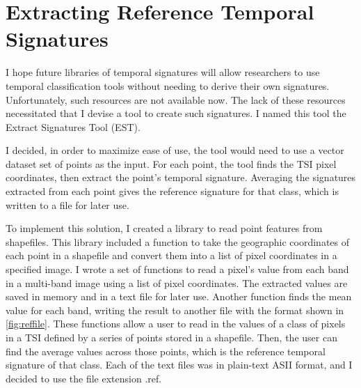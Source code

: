 \section{Extracting Reference Temporal Signatures}
\label{appendix:tools:extract}

I hope future libraries of temporal signatures will allow researchers to use temporal classification tools without needing to derive their own signatures. Unfortunately, such resources are not available now. The lack of these resources necessitated that I devise a tool to create such signatures. I named this tool the Extract Signatures Tool (EST).

I decided, in order to maximize ease of use, the tool would need to use a vector dataset set of points as the input. For each point, the tool finds the TSI pixel coordinates, then extract the point’s temporal signature. Averaging the signatures extracted from each point gives the reference signature for that class, which is written to a file for later use.

To implement this solution, I created a library to read point features from shapefiles. This library included a function to take the geographic coordinates of each point in a shapefile and convert them into a list of pixel coordinates in a specified image. I wrote a set of functions to read a pixel's value from each band in a multi-band image using a list of pixel coordinates. The extracted values are saved in memory and in a text file for later use. Another function finds the mean value for each band, writing the result to another file with the format shown in \autoref{fig:reffile}. These functions allow a user to read in the values of a class of pixels in a TSI defined by a series of points stored in a shapefile. Then, the user can find the average values across those points, which is the reference temporal signature of that class. Each of the text files was in plain-text ASII format, and I decided to use the file extension .ref.


